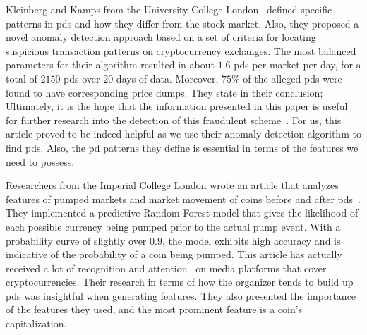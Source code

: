 Kleinberg and Kamps from the University College London~\cite{P&D_to_the_moon} defined specific patterns in \acp{pd} and how they differ from the stock market. Also, they proposed a novel anomaly detection approach based on a set of criteria for locating suspicious transaction patterns on cryptocurrency exchanges. The most balanced parameters for their algorithm resulted in about $1.6$ \acp{pd} per market per day, for a total of $2150$ \acp{pd} over $20$ days of data. Moreover, $75\%$ of the alleged \acp{pd} were found to have corresponding price dumps. They state in their conclusion; Ultimately, it is the hope that the information presented in this paper is useful for further research into the detection of this fraudulent scheme~\cite{P&D_to_the_moon}. For us, this article proved to be indeed helpful as we use their anomaly detection algorithm to find \acp{pd}. Also, the \ac{pd} patterns they define is essential in terms of the features we need to possess.

Researchers from the Imperial College London wrote an article that analyzes features of pumped markets and market movement of coins before and after \acp{pd}~\cite{P&D_anatomy}. They implemented a predictive Random Forest model that gives the likelihood of each possible currency being pumped prior to the actual pump event. With a probability curve of slightly over $0.9$, the model exhibits high accuracy and is indicative of the probability of a coin being pumped. This article has actually received a lot of recognition and attention~\cite{P&D_MIT_crypto, P&D_cointelegraph, P&D_UTB} on media platforms that cover cryptocurrencies. Their research in terms of how the organizer tends to build up \acp{pd} was insightful when generating features. They also presented the importance of the features they used, and the most prominent feature is a coin's capitalization.